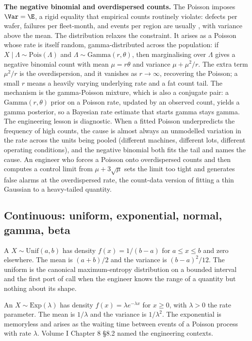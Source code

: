 \begin{mastery}
\textbf{The negative binomial and overdispersed counts.} The Poisson
imposes $\Var = \E$, a rigid equality that empirical counts routinely
violate: defects per wafer, failures per fleet-month, and events per
region are usually , with variance above the
mean. The  distribution relaxes the
constraint. It arises as a Poisson whose rate is itself random,
gamma-distributed across the population: if $X \mid \Lambda \sim
\mathrm{Pois}(\Lambda)$ and $\Lambda \sim \mathrm{Gamma}(r, \theta)$,
then marginalising over $\Lambda$ gives a negative binomial count with
mean $\mu = r\theta$ and variance $\mu + \mu^{2}/r$. The extra term
$\mu^{2}/r$ is the overdispersion, and it vanishes as $r \to \infty$,
recovering the Poisson; a small $r$ means a heavily varying underlying
rate and a fat count tail. The mechanism is the gamma-Poisson mixture,
which is also a conjugate pair: a $\mathrm{Gamma}(r, \theta)$ prior on a
Poisson rate, updated by an observed count, yields a gamma posterior, so
a Bayesian rate estimate that starts gamma stays gamma. The engineering
lesson is diagnostic. When a fitted Poisson underpredicts the frequency
of high counts, the cause is almost always an unmodelled variation in the
rate across the units being pooled (different machines, different lots,
different operating conditions), and the negative binomial both fits the
tail and names the cause. An engineer who forces a Poisson onto
overdispersed counts and then computes a control limit from
$\mu + 3\sqrt{\mu}$ sets the limit too tight and generates false alarms
at the overdispersed rate, the count-data version of fitting a thin
Gaussian to a heavy-tailed quantity.
\end{mastery}

\subsection{Continuous: uniform, exponential, normal, gamma, beta}

A  $X \sim \mathrm{Unif}(a, b)$ has
density $f(x) = 1/(b - a)$ for $a \leq x \leq b$ and zero elsewhere.
The mean is $(a + b)/2$ and the variance is $(b - a)^{2}/12$. The
uniform is the canonical maximum-entropy distribution on a bounded
interval and the first port of call when the engineer knows the
range of a quantity but nothing about its shape.

An  $X \sim \mathrm{Exp}(\lambda)$
has density $f(x) = \lambda e^{-\lambda x}$ for $x \geq 0$, with
$\lambda > 0$ the rate parameter. The mean is $1/\lambda$ and the
variance is $1/\lambda^{2}$. The exponential is memoryless and
arises as the waiting time between events of a Poisson process with
rate $\lambda$. Volume I Chapter 8 §8.2 named the engineering
contexts.

